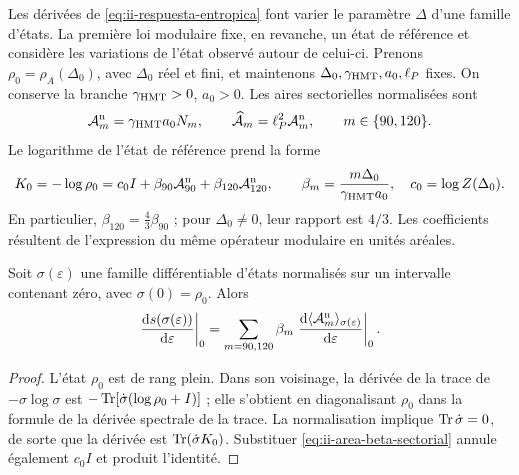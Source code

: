 Les dérivées de \eqref{eq:ii-respuesta-entropica} font varier le paramètre
\(\Delta\) d’une famille d’états. La première loi modulaire fixe,
en revanche, un état de référence et considère les variations de l’état
observé autour de celui-ci. Prenons
\(\rho_0=\rho_A(\Delta_0)\), avec \(\Delta_0\) réel et fini,
et maintenons \(\Delta_0,\gamma_{\mathrm{HMT}},a_0,\ell_P\) fixes.
On conserve la branche \(\gamma_{\mathrm{HMT}}>0\), \(a_0>0\).
Les aires sectorielles normalisées sont
\begin{equation}
 \mathcal A_m^{\rm n}=\gamma_{\mathrm{HMT}}a_0N_m,
 \qquad
 \widehat{\mathcal A}_m=\ell_P^2\mathcal A_m^{\rm n},
 \qquad m\in\{90,120\}.
 \label{eq:ii-area-sector-normalizado}
\end{equation}
Le logarithme de l'état de référence prend la forme
\begin{equation}
 K_0=-\log\rho_0
 =c_0I+\beta_{90}\mathcal A_{90}^{\rm n}
         +\beta_{120}\mathcal A_{120}^{\rm n},
 \qquad
 \beta_m=\frac{m\Delta_0}{\gamma_{\mathrm{HMT}}a_0},
 \quad c_0=\log Z(\Delta_0).
 \label{eq:ii-area-beta-sectorial}
\end{equation}
En particulier, \(\beta_{120}=\tfrac43\beta_{90}\) ; pour
\(\Delta_0\ne0\), leur rapport est \(4/3\). Les coefficients
résultent de l'expression du même opérateur modulaire en unités aréales.

\begin{theorem}
\label{thm:ii-area-primera-ley}
Soit \(\sigma(\varepsilon)\) une famille différentiable d’états
normalisés sur un intervalle contenant zéro, avec
\(\sigma(0)=\rho_0\). Alors
\begin{equation}
 \left.\frac{\mathrm d s(\sigma(\varepsilon))}{\mathrm d\varepsilon}\right|_0
 =\sum_{m=90,120}\beta_m
   \left.\frac{\mathrm d\langle\mathcal A_m^{\rm n}\rangle_
                       {\sigma(\varepsilon)}}{\mathrm d\varepsilon}\right|_0.
 \label{eq:ii-area-primera-ley}
\end{equation}
\end{theorem}
\begin{proof}
L'état \(\rho_0\) est de rang plein. Dans son voisinage, la dérivée
de la trace de \(-\sigma\log\sigma\) est
\(-\operatorname{Tr}[\dot\sigma(\log\rho_0+I)]\) ; elle s'obtient en diagonalisant
\(\rho_0\) dans la formule de la dérivée spectrale de la trace.
La normalisation implique \(\operatorname{Tr}\dot\sigma=0\), de sorte que la
dérivée est \(\operatorname{Tr}(\dot\sigma K_0)\). Substituer
\eqref{eq:ii-area-beta-sectorial} annule également \(c_0I\) et
produit l'identité.
\end{proof}


